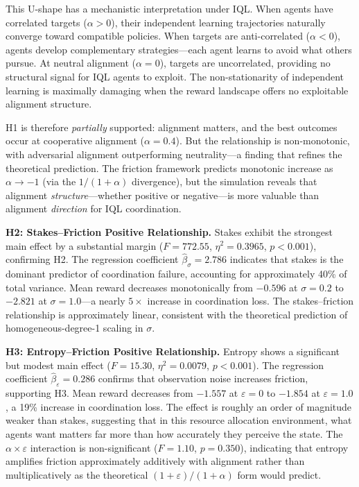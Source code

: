 This U-shape has a mechanistic interpretation under IQL. When agents have correlated targets ($\alpha > 0$), their independent learning trajectories naturally converge toward compatible policies. When targets are anti-correlated ($\alpha < 0$), agents develop complementary strategies---each agent learns to avoid what others pursue. At neutral alignment ($\alpha = 0$), targets are uncorrelated, providing no structural signal for IQL agents to exploit. The non-stationarity of independent learning is maximally damaging when the reward landscape offers no exploitable alignment structure.

H1 is therefore \emph{partially} supported: alignment matters, and the best outcomes occur at cooperative alignment ($\alpha = 0.4$). But the relationship is non-monotonic, with adversarial alignment outperforming neutrality---a finding that refines the theoretical prediction. The friction framework predicts monotonic increase as $\alpha \to -1$ (via the $1/(1+\alpha)$ divergence), but the simulation reveals that alignment \emph{structure}---whether positive or negative---is more valuable than alignment \emph{direction} for IQL coordination.

\textbf{H2: Stakes--Friction Positive Relationship.} Stakes exhibit the strongest main effect by a substantial margin ($F = 772.55$, $\eta^2 = 0.3965$, $p < 0.001$), confirming H2. The regression coefficient $\hat{\beta}_\sigma = 2.786$ indicates that stakes is the dominant predictor of coordination failure, accounting for approximately 40\% of total variance. Mean reward decreases monotonically from $-0.596$ at $\sigma = 0.2$ to $-2.821$ at $\sigma = 1.0$---a nearly $5\times$ increase in coordination loss. The stakes--friction relationship is approximately linear, consistent with the theoretical prediction of homogeneous-degree-1 scaling in $\sigma$.

\textbf{H3: Entropy--Friction Positive Relationship.} Entropy shows a significant but modest main effect ($F = 15.30$, $\eta^2 = 0.0079$, $p < 0.001$). The regression coefficient $\hat{\beta}_\varepsilon = 0.286$ confirms that observation noise increases friction, supporting H3. Mean reward decreases from $-1.557$ at $\varepsilon = 0$ to $-1.854$ at $\varepsilon = 1.0$, a 19\% increase in coordination loss. The effect is roughly an order of magnitude weaker than stakes, suggesting that in this resource allocation environment, what agents want matters far more than how accurately they perceive the state. The $\alpha \times \varepsilon$ interaction is non-significant ($F = 1.10$, $p = 0.350$), indicating that entropy amplifies friction approximately additively with alignment rather than multiplicatively as the theoretical $(1+\varepsilon)/(1+\alpha)$ form would predict.

